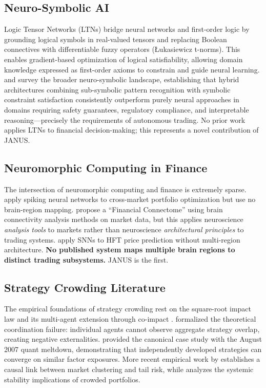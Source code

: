 \documentclass[12pt, a4paper]{article}
\begin{document}
\subsection{Neuro-Symbolic AI}
\label{sec:rw_neurosymbolic}

Logic Tensor Networks (LTNs) \citep{badreddine2022logic, serafini2016ltn} bridge neural networks and first-order logic by grounding logical symbols in real-valued tensors and replacing Boolean connectives with differentiable fuzzy operators (Łukasiewicz t-norms). This enables gradient-based optimization of logical satisfiability, allowing domain knowledge expressed as first-order axioms to constrain and guide neural learning. \citet{marra2024neurosymbolic} and \citet{garcez2023neurosymbolic} survey the broader neuro-symbolic landscape, establishing that hybrid architectures combining sub-symbolic pattern recognition with symbolic constraint satisfaction consistently outperform purely neural approaches in domains requiring safety guarantees, regulatory compliance, and interpretable reasoning---precisely the requirements of autonomous trading. No prior work applies LTNs to financial decision-making; this represents a novel contribution of JANUS.

\subsection{Neuromorphic Computing in Finance}
\label{sec:rw_neuromorphic_finance}

The intersection of neuromorphic computing and finance is extremely sparse. \citet{mohan2025snn_portfolio} apply spiking neural networks to cross-market portfolio optimization but use no brain-region mapping. \citet{bi2025financial_connectome} propose a ``Financial Connectome'' using brain connectivity analysis methods on market data, but this applies neuroscience \textit{analysis tools} to markets rather than neuroscience \textit{architectural principles} to trading systems. \citet{ezinwoke2025snn_hft} apply SNNs to HFT price prediction without multi-region architecture. \textbf{No published system maps multiple brain regions to distinct trading subsystems.} JANUS is the first.

\subsection{Strategy Crowding Literature}
\label{sec:rw_crowding}

The empirical foundations of strategy crowding rest on the square-root impact law \citep{toth2011anomalous, bouchaud2018trades, bucci2019crossover} and its multi-agent extension through co-impact \citep{bucci2020coimpact}. \citet{stein2009crowding} formalized the theoretical coordination failure: individual agents cannot observe aggregate strategy overlap, creating negative externalities. \citet{khandani2011quants} provided the canonical case study with the August 2007 quant meltdown, demonstrating that independently developed strategies can converge on similar factor exposures. More recent empirical work by \citet{vankralingen2021crowded} establishes a causal link between market clustering and tail risk, while \citet{caccioli2014stability} analyzes the systemic stability implications of crowded portfolios.
\end{document}

